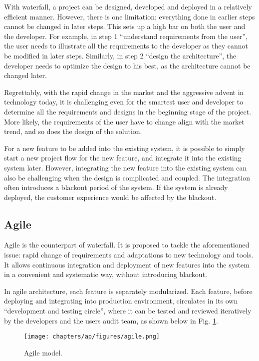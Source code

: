 With waterfall, a project can be designed, developed and deployed in a relatively efficient manner. However, there is one limitation: everything done in earlier steps cannot be changed in later steps. This sets up a high bar on both the user and the developer. For example, in step 1 ``understand requirements from the user'', the user needs to illustrate all the requirements to the developer as they cannot be modified in later steps. Similarly, in step 2 ``design the architecture'', the developer needs to optimize the design to his best, as the architecture cannot be changed later.

Regrettably, with the rapid change in the market and the aggressive advent in technology today, it is challenging even for the smartest user and developer to determine all the requirements and designs in the beginning stage of the project. More likely, the requirements of the user have to change align with the market trend, and so does the design of the solution.

For a new feature to be added into the existing system, it is possible to simply start a new project flow for the new feature, and integrate it into the existing system later. However, integrating the new feature into the existing system can also be challenging when the design is complicated and coupled. The integration often introduces a blackout period of the system. If the system is already deployed, the customer experience would be affected by the blackout.

\subsection{Agile}

Agile is the counterpart of waterfall. It is proposed to tackle the aforementioned issue: rapid change of requirements and adaptations to new technology and tools. It allows continuous integration and deployment of new features into the system in a convenient and systematic way, without introducing blackout.

In agile architecture, each feature is separately modularized. Each feature, before deploying and integrating into production environment, circulates in its own ``development and testing circle'', where it can be tested and reviewed iteratively by the developers and the users audit team, as shown below in Fig. \ref{ch:cicd:fig:agile}.
\begin{figure}[htbp]
	\centering
	\texttt{[image: chapters/ap/figures/agile.png]}
	\caption{Agile model.} \label{ch:cicd:fig:agile}
\end{figure}

